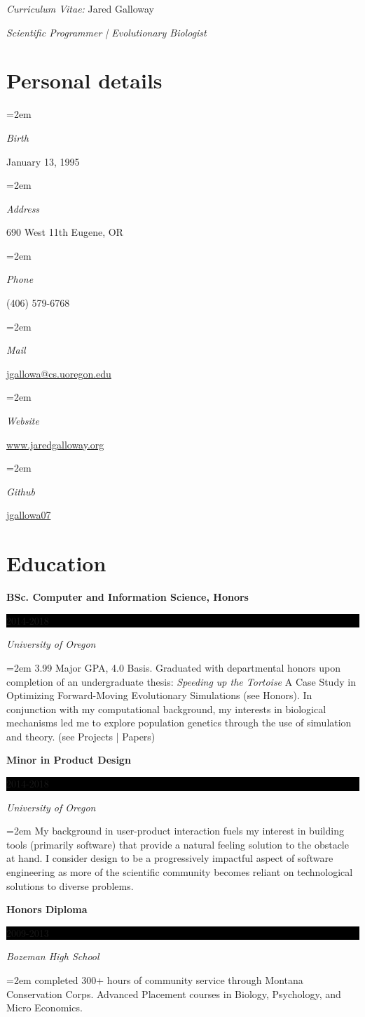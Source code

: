 \documentclass[paper=a4,fontsize=11pt]{scrartcl} %
\newlength{\spacebox}
\newcommand{\sepspace}{\vspace*{1em}}		%
\newcommand{\MyName}[1]{ %
		\Huge \usefont{OT1}{phv}{b}{n} \hfill #1
		\par \normalsize \normalfont}
\newcommand{\MySlogan}[1]{ %
		\large \usefont{OT1}{phv}{m}{n}\hfill \textit{#1}
		\par \normalsize \normalfont}
\newcommand{\PersonalEntry}[2]{
		\noindent\hangindent=2em\hangafter=0 %
		\parbox{\spacebox}{        %
		\textit{#1}}		       %
		\hspace{1.5em} #2 \par}    %
\newcommand{\EducationEntry}[4]{
		\noindent \textbf{#1} \hfill      %
		\colorbox{Black}{%
			\parbox{6em}{%
			\hfill\color{White}#2}} \par  %
		\noindent \textit{#3} \par        %
		\noindent\hangindent=2em\hangafter=0 \small #4 %
		\normalsize \par}
\begin{document}

\textit{Curriculum Vitae:}
\MyName{Jared Galloway}
\MySlogan{Scientific Programmer | Evolutionary Biologist}
\sepspace

\sepspace

\section*{Personal details}{}

\PersonalEntry{Birth}{January 13, 1995}
\PersonalEntry{Address}{690 West 11th Eugene, OR}
\PersonalEntry{Phone}{(406) 579-6768}
\PersonalEntry{Mail}{\url{jgallowa@cs.uoregon.edu}}
\PersonalEntry{Website}{\href{https://www.jaredgalloway.org}{www.jaredgalloway.org}}
\PersonalEntry{Github}{\href{https://github.com/jgallowa07}{jgallowa07}}

\section*{Education}{}

\EducationEntry{BSc. Computer and Information Science, Honors}{2014-2018}{University of Oregon}
{3.99 Major GPA, 4.0 Basis. Graduated with departmental honors upon completion of an undergraduate thesis:
\textit{Speeding up the Tortoise}
A Case Study in Optimizing Forward-Moving Evolutionary Simulations
 (see Honors). In conjunction with my computational background, my interests in biological mechanisms
 led me to explore population genetics through the use of simulation and theory. (see Projects | Papers)}
\sepspace

\EducationEntry{Minor in Product Design}{2014-2018}{University of Oregon}
{My background in user-product interaction fuels my interest in building tools (primarily software)
that provide a natural feeling solution to the obstacle at hand. I consider design to be a progressively
impactful aspect of software engineering as more of the scientific community 
becomes reliant on technological solutions to diverse problems. 
}
\sepspace

\EducationEntry{Honors Diploma}{2009-2013}{Bozeman High School}
{completed 300+ hours of community service through Montana Conservation Corps.
Advanced Placement courses in Biology, Psychology, and Micro Economics.
}
\sepspace
\end{document}
